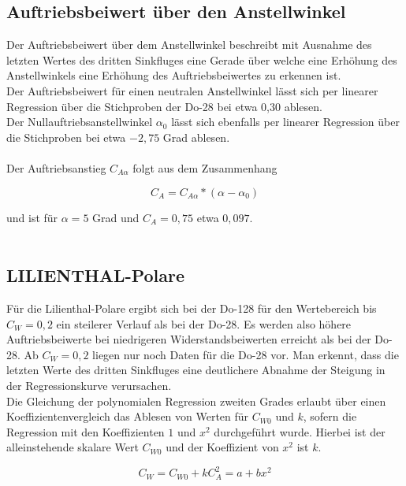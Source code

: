 \subsection{Auftriebsbeiwert über den Anstellwinkel}
Der Auftriebsbeiwert über dem Anstellwinkel beschreibt mit Ausnahme des letzten Wertes des dritten Sinkfluges eine Gerade über welche eine Erhöhung des Anstellwinkels eine Erhöhung des Auftriebsbeiwertes zu erkennen ist.\\
Der Auftriebsbeiwert für einen neutralen Anstellwinkel lässt sich per linearer Regression über die Stichproben der Do-28 bei etwa 0,30 ablesen.\\
Der Nullauftriebsanstellwinkel $\alpha_{0}$ lässt sich ebenfalls per linearer Regression über die Stichproben bei etwa $-2,75$ Grad ablesen.\\\\
Der Auftriebsanstieg $C_{A\alpha}$ folgt aus dem Zusammenhang

\begin{equation*}
C_{A} = C_{A\alpha} * (\alpha-\alpha_{0})
\end{equation*}

\vspace{5mm}
\noindent und ist für $\alpha = 5$ Grad und $C_{A} = 0,75$ etwa $0,097$.\\\\

\subsection{LILIENTHAL-Polare}
Für die Lilienthal-Polare ergibt sich bei der Do-128 für den Wertebereich bis $C_{W} = 0,2$ ein steilerer Verlauf als bei der Do-28. Es werden also höhere Auftriebsbeiwerte bei niedrigeren Widerstandsbeiwerten erreicht als bei der Do-28.
Ab $C_{W} = 0,2$ liegen nur noch Daten für die Do-28 vor. Man erkennt, dass die letzten Werte des dritten Sinkfluges eine deutlichere Abnahme der Steigung in der Regressionskurve verursachen.\\
Die Gleichung der polynomialen Regression zweiten Grades erlaubt über einen Koeffizientenvergleich das Ablesen von Werten für $C_{W0}$ und $k$, sofern die Regression mit den Koeffizienten $1$ und $x^{2}$ durchgeführt wurde. Hierbei ist der alleinstehende skalare Wert $C_{W0}$ und der Koeffizient von $x^{2}$ ist $k$.

\begin{equation*}
C_{W} = C_{W0} + k C_{A}^{2} = a + b x^{2}
\end{equation*}

